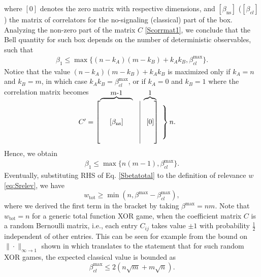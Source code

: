 \documentclass[pra,twocolumn,showpacs,preprintnumbers,amsmath,amssymb,superscriptaddress]{revtex4-1}
\def\be{\begin{equation}}
\def\ee{\end{equation}}
\def\ben{\begin{eqnarray}}
\def\een{\end{eqnarray}}
\def\betaMax{\beta^{\max}}
\def\betaMaxcl{\beta^{\max}_{cl}}
\def\relev{w}
\newcommand\bovermat[2]{%
  \makebox[0pt][l]{$\smash{\overbrace{\phantom{%
    \begin{matrix}#2\end{matrix}}}^{\text{#1}}}$}#2}
\begin{document}
\begin{appendix}
\begin{enumerate}
where $[0]$ denotes the zero matrix with respective dimensions, and $[\beta_{\text{ns}}]$ ($[\beta_{cl}]$) the matrix of correlators for the no-signaling (classical) part of the box.
Analyzing the non-zero part of the matrix $C$ \eqref{Scorrmat1}, we conclude that the Bell quantity for such box depends on the number of deterministic observables, such that
\ben
\beta_1 \leq \max \{ (n-k_A)(m-k_B)+ k_Ak_B, \betaMaxcl \}.
\een
Notice that the value $(n-k_A)(m-k_B)+ k_Ak_B$ is maximized only if $k_A =n$ and $k_B =m$, in which case $k_Ak_B=\betaMaxcl$, or if $k_A =0$ and $k_B =1$ where the correlation matrix becomes\\
\be\label{Scorrmat2}
\begin{matrix}
C'
 =
 \begin{bmatrix}
\bovermat{\normalsize{$m$-$1$}} {\begin{matrix} \text{ }&\text{ }& \text{ } \\ \text{ }&\text{ }& \text{ } \\ \text{ }&[\beta_{\text{ns}}]  &\text{ } \\ \text{ } & \text{ } & \text{ } \\ \text{ } & \text{ } & \text{ } \end{matrix}} & \vline & \hspace{-0.5em} \bovermat{\normalsize{$1$}}{\begin{matrix} \text{ } \\ \text{ } \\ \hspace{0.4em} [0] \\ \text{ } \\ \text{ } \end{matrix}} \\[0.5em]
  \end{bmatrix}
  \begin{aligned}
  &\left.\begin{matrix}
   \vspace{0.5em}
  \\
  \\
  \\
  \\
  \end{matrix} \right\} %
 n.\    \end{aligned}
 \end{matrix}
 \ee
Hence, we obtain
\ben
\label{Sbetatotal}
\beta_1 \leq\max \{ n(m-1),\betaMaxcl \}.
\een
Eventually, substituting RHS of Eq. \eqref{Sbetatotal} to the definition of relevance $\relev$ \eqref{eq:Srelev}, we have
\be
\label{eq:Srelevtotal}
\relev_{\text{tot}}  \geq \min(n, \betaMax-\betaMaxcl),
\ee
where we derived the first term in the bracket by taking $\betaMax= n m $. Note that $\relev_{\text{tot}} = n$ for a generic total function XOR game, when the coefficient matrix $C$ is a random Bernoulli matrix, i.e., each entry $C_{ij}$ takes value $\pm 1$ with probability $\frac12$ independent of other entries. This can be seen for example from the bound on $\| \cdot \|_{\infty \rightarrow 1}$ shown in \cite{GT09} which translates to the statement that for such random \textsc{XOR} games, the expected classical value is bounded as
\be 
\betaMaxcl \leq 2( n \sqrt{m} + m \sqrt{n}).
\ee


\end{enumerate}
\end{appendix}
\end{document}
